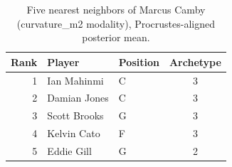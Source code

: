 \begin{table}[htbp]
  \centering\small
  \begin{tabular}{rllc}
    \toprule
    Rank & Player & Position & Archetype \\
    \midrule
    1 & Ian Mahinmi & C & 3 \\
    2 & Damian Jones & C & 3 \\
    3 & Scott Brooks & G & 3 \\
    4 & Kelvin Cato & F & 3 \\
    5 & Eddie Gill & G & 2 \\
    \bottomrule
  \end{tabular}
  \caption{Five nearest neighbors of Marcus Camby (curvature_m2 modality), Procrustes-aligned posterior mean.}
  \label{tab:Marcus_Camby_neighbors_curvature_m2}
\end{table}

